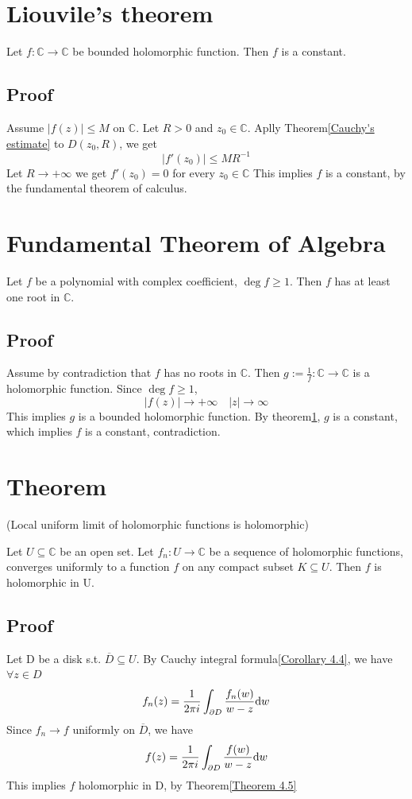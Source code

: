 \documentclass{book}
\newcommand{\abs}[1]{\left\lvert #1 \right\rvert}
\begin{document}
\section{Liouvile's theorem}
\label{Liouville's theorem}
Let $f:\mathbb C\to \mathbb C$ be bounded holomorphic function. Then $f$ is a constant.
\subsection*{Proof}
Assume $\abs{f(z)}\leq M$ on $\mathbb C$. Let $R>0$ and $z_0\in \mathbb C$. Aplly Theorem\ref{Cauchy's estimate} to $D(z_0,R)$, we get $$\abs{f'(z_0)}\leq MR^{-1}$$
Let $R\to +\infty$ we get $f'(z_0)=0$ for every $z_0\in \mathbb C$ This implies $f$ is a constant, by the fundamental theorem of calculus.
\section{Fundamental Theorem of Algebra}
Let $f$ be a polynomial with complex coefficient, $\deg f\geq 1$. Then $f$ has at least one root in  $\mathbb C$.
\subsection*{Proof}
Assume by contradiction that $f$ has no roots in $\mathbb C$. Then $g:=\frac{1}{f}:\mathbb C\to \mathbb C$ is a holomorphic function. Since $\deg f\geq 1$, $$\abs{f(z)}\to +\infty\quad \abs{z}\to \infty$$
This implies $g$ is a bounded holomorphic function. By theorem\ref{Liouville's theorem}, $g$ is a constant, which implies $f$ is a constant, contradiction.
\section{Theorem}
(Local uniform limit of holomorphic functions is holomorphic)

Let $U\subseteq \mathbb C$ be an open set. Let $f_n:U\to \mathbb C$ be a sequence of holomorphic functions, converges uniformly to a function $f$ on any compact subset $K\subseteq U$. Then $f$ is holomorphic in U.
\subsection*{Proof}
Let D be a disk s.t. $\overline D\subseteq U$. By Cauchy integral formula\ref{Corollary 4.4}, we have $\forall z\in D$
$$f_n(z)=\frac{1}{2\pi i}\int_{\partial D}\frac{f_n(w)}{w-z}\text dw$$
Since $f_n\to f$ uniformly on $\overline D$, we have
$$f(z)=\frac{1}{2\pi i}\int_{\partial D}\frac{f(w)}{w-z}\text dw$$
This implies $f$ holomorphic in D, by Theorem\ref{Theorem 4.5}
\end{document}
